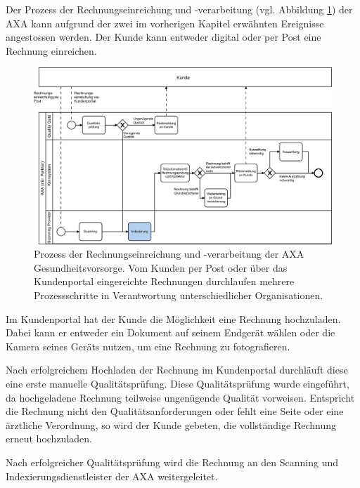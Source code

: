 Der Prozess der Rechnungseinreichung und -verarbeitung (vgl. Abbildung \ref{prozessaxa}) der AXA kann aufgrund der zwei im vorherigen Kapitel erwähnten Ereignisse angestossen werden. Der Kunde kann entweder digital oder per Post eine Rechnung einreichen. 

\begin{figure}[h]
    \captionsetup{width=.9\linewidth}
    \caption[Prozess der Rechnungseinreichung und -verarbeitung der AXA Gesundheitsvorsorge]{Prozess der Rechnungseinreichung und -verarbeitung der AXA Gesundheitsvorsorge. Vom Kunden per Post oder über das Kundenportal eingereichte Rechnungen durchlaufen mehrere Prozessschritte in Verantwortung unterschiedlicher Organisationen.}
    \label{prozessaxa}
    \centering
    \vspace{0.2cm}
    \includegraphics[width=\textwidth]{graphics/rechnungseinreichung-bpmn.pdf}
\end{figure}

Im Kundenportal hat der Kunde die Möglichkeit eine Rechnung hochzuladen. Dabei kann er entweder ein Dokument auf seinem Endgerät wählen oder die Kamera seines Geräts nutzen, um eine Rechnung zu fotografieren.

Nach erfolgreichem Hochladen der Rechnung im Kundenportal durchläuft diese eine erste manuelle Qualitätsprüfung. Diese Qualitätsprüfung wurde eingeführt, da hochgeladene Rechnung teilweise ungenügende Qualität vorweisen. Entspricht die Rechnung nicht den Qualitätsanforderungen oder fehlt eine Seite oder eine ärztliche Verordnung, so wird der Kunde gebeten, die vollständige Rechnung erneut hochzuladen.

Nach erfolgreicher Qualitätsprüfung wird die Rechnung an den Scanning und Indexierungsdienstleister der AXA weitergeleitet.

